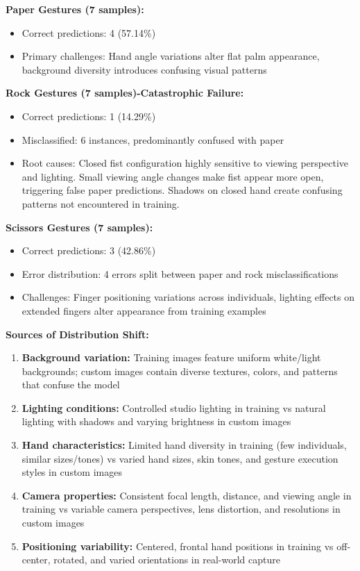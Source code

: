 \documentclass[12pt,a4paper]{article}
\begin{document}
\textbf{Paper Gestures (7 samples):}
\begin{itemize}
    \item Correct predictions: 4 (57.14\%)
    \item Primary challenges: Hand angle variations alter flat palm appearance, background diversity introduces confusing visual patterns
\end{itemize}

\textbf{Rock Gestures (7 samples)-Catastrophic Failure:}
\begin{itemize}
    \item Correct predictions: 1 (14.29\%)
    \item Misclassified: 6 instances, predominantly confused with paper
    \item Root causes: Closed fist configuration highly sensitive to viewing perspective and lighting. Small viewing angle changes make fist appear more open, triggering false paper predictions. Shadows on closed hand create confusing patterns not encountered in training.
\end{itemize}

\textbf{Scissors Gestures (7 samples):}
\begin{itemize}
    \item Correct predictions: 3 (42.86\%)
    \item Error distribution: 4 errors split between paper and rock misclassifications
    \item Challenges: Finger positioning variations across individuals, lighting effects on extended fingers alter appearance from training examples
\end{itemize}

\textbf{Sources of Distribution Shift:}

\begin{enumerate}
    \item \textbf{Background variation:} Training images feature uniform white/light backgrounds; custom images contain diverse textures, colors, and patterns that confuse the model
    \item \textbf{Lighting conditions:} Controlled studio lighting in training vs natural lighting with shadows and varying brightness in custom images
    \item \textbf{Hand characteristics:} Limited hand diversity in training (few individuals, similar sizes/tones) vs varied hand sizes, skin tones, and gesture execution styles in custom images
    \item \textbf{Camera properties:} Consistent focal length, distance, and viewing angle in training vs variable camera perspectives, lens distortion, and resolutions in custom images
    \item \textbf{Positioning variability:} Centered, frontal hand positions in training vs off-center, rotated, and varied orientations in real-world capture
\end{enumerate}
\end{document}
